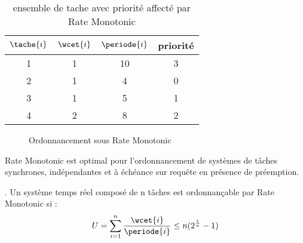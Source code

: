 \begin{table}[h]
\begin{center}
\begin{tabular}{|c|c|c|c|}
 \hline $\tache{i}$ & $\wcet{i}$ & $\periode{i}$ & priorité\\ 
 \hline 1 & 1 & 10 & 3\\ 
 \hline 2 & 1 & 4 & 0\\ 
 \hline 3 & 1 & 5 & 1\\ 
 \hline 4 & 2 & 8 & 2\\ 
 \hline
 \end{tabular}
\end{center}
\caption{ensemble de tache avec priorité affecté par Rate Monotonic} \label{tab:exempleRM}
\end{table}

\vspace{1cm}

\begin{figure}[h]
\begin{center}
\begin{RTGrid}[height=4cm,width=12cm,labelsize=8pt,numbersize=6]{4}{13}
\end{RTGrid}
\caption{Ordonnancement sous Rate Monotonic} \label{fig:exempleRM}
\end{center}
\end{figure}
\vspace{1cm}

\begin{theoreme}
Rate Monotonic est optimal pour l'ordonnancement de systèmes de tâches synchrones, indépendantes et à échéance sur requête en présence de préemption.
\end{theoreme}

\begin{theoreme}. Un système temps réel composé de n tâches est ordonnançable par Rate Monotonic si :
\begin{equation}
U = \sum_{i=1}^n \frac{\wcet{i}}{\periode{i}} \leq n ( 2^{\frac{1}{n}} - 1)
\end{equation}
\end{theoreme}

